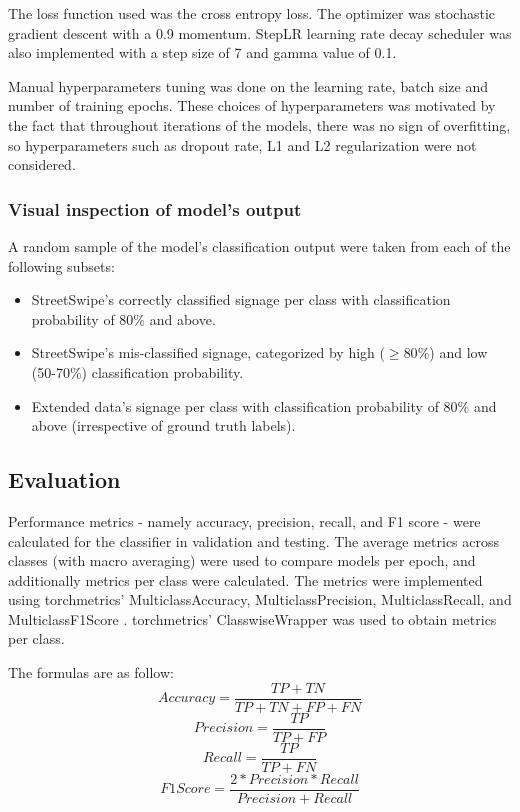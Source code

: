 The loss function used was the cross entropy loss. The optimizer was stochastic gradient descent with a 0.9 momentum. StepLR learning rate decay scheduler was also implemented with a step size of 7 and gamma value of 0.1.

Manual hyperparameters tuning was done on the learning rate, batch size and number of training epochs. These choices of hyperparameters was motivated by the fact that throughout iterations of the models, there was no sign of overfitting, so hyperparameters such as dropout rate, L1 and L2 regularization were not considered.

\subsubsection{Visual inspection of model's output}
A random sample of the model's classification output were taken from each of the following subsets:

\begin{itemize}
    \item StreetSwipe's correctly classified signage per class with classification probability of 80\% and above.
    \item StreetSwipe's mis-classified signage, categorized by high ($ \geq 80\% $) and low (50-70\%) classification probability.
    \item Extended data's signage per class with classification probability of 80\% and above (irrespective of ground truth labels).
\end{itemize}

\subsection{Evaluation}
Performance metrics - namely accuracy, precision, recall, and F1 score - were calculated for the classifier in validation and testing. The average metrics across classes (with macro averaging) were used to compare models per epoch, and additionally metrics per class were calculated. The metrics were implemented using torchmetrics' MulticlassAccuracy, MulticlassPrecision, MulticlassRecall, and MulticlassF1Score \cite{torchmetrics}. torchmetrics' ClasswiseWrapper was used to obtain metrics per class.

The formulas are as follow:
\[Accuracy = \frac{TP+TN}{TP+TN+FP+FN}\]
\[Precision = \frac{TP}{TP+FP}\]
\[Recall = \frac{TP}{TP+FN}\]
\[F1 Score = \frac{2 * Precision * Recall}{Precision + Recall}\]
